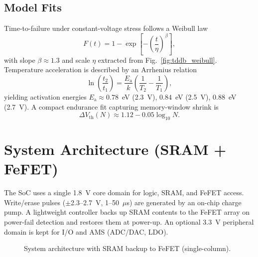 \documentclass[conference]{IEEEtran}
\newcommand{\Vth}{V_{\mathrm{th}}}
\newcommand{\Ea}{E_{\mathrm{a}}}
\newcommand{\betaW}{\beta} %
\newcommand{\etaW}{\eta}   %
\begin{document}
\subsection{Model Fits}
Time-to-failure under constant-voltage stress follows a Weibull law
\begin{equation}
  F(t)=1-\exp\!\left[-\left(\frac{t}{\etaW}\right)^{\betaW}\right],
\end{equation}
with slope $\betaW \approx 1.3$ and scale $\etaW$ extracted from Fig.~\ref{fig:tddb_weibull}.
Temperature acceleration is described by an Arrhenius relation
\begin{equation}
  \ln\!\left(\frac{t_2}{t_1}\right)=\frac{\Ea}{k}\!\left(\frac{1}{T_2}-\frac{1}{T_1}\right),
\end{equation}
yielding activation energies $\Ea \approx 0.78$~eV (2.3~V), $0.84$~eV (2.5~V), $0.88$~eV (2.7~V).
A compact endurance fit capturing memory-window shrink is
\begin{equation}
  \Delta \Vth(N) \approx 1.12 - 0.05\log_{10} N.
\end{equation}

\section{System Architecture (SRAM + FeFET)}
The SoC uses a single 1.8~V core domain for logic, SRAM, and FeFET access.
Write/erase pulses ($\pm$2.3--2.7~V, 1--50~$\mu$s) are generated by an on-chip charge pump.
A lightweight controller backs up SRAM contents to the FeFET array on power-fail detection and restores them at power-up.
An optional 3.3~V peripheral domain is kept for I/O and AMS (ADC/DAC, LDO).

\begin{figure}[!t]
  \centering
  \caption{System architecture with SRAM backup to FeFET (single-column).}
  \label{fig:system}
\end{figure}
\end{document}
